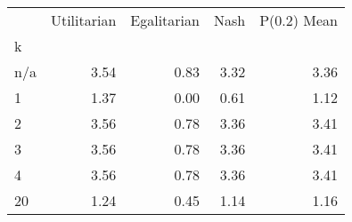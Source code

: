 \begin{tabular}{lrrrr}
\toprule
 & Utilitarian & Egalitarian & Nash & P(0.2) Mean \\
k &  &  &  &  \\
\midrule
n/a & 3.54 & 0.83 & 3.32 & 3.36 \\
1 & 1.37 & 0.00 & 0.61 & 1.12 \\
2 & 3.56 & 0.78 & 3.36 & 3.41 \\
3 & 3.56 & 0.78 & 3.36 & 3.41 \\
4 & 3.56 & 0.78 & 3.36 & 3.41 \\
20 & 1.24 & 0.45 & 1.14 & 1.16 \\
\bottomrule
\end{tabular}
